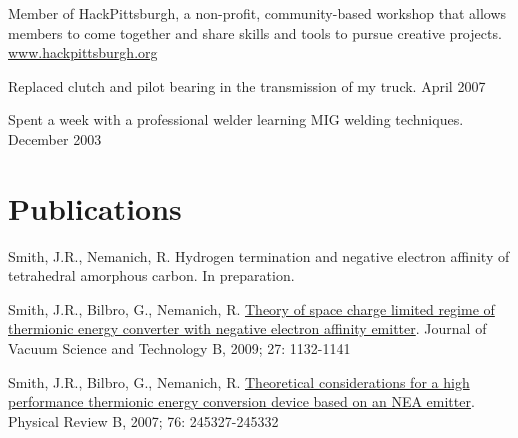 \documentclass[letterpaper,margin,line]{res}
\begin{document}
\begin{resume}
\vspace{-.3cm}
Member of HackPittsburgh, a non-profit, community-based workshop that allows members to come together and share skills and tools to pursue creative projects. \href{http://www.hackpittsburgh.org}{www.hackpittsburgh.org}

\vspace{-.3cm}
Replaced clutch and pilot bearing in the transmission of my truck. April 2007

\vspace{-.3cm}
Spent a week with a professional welder learning MIG welding techniques. December 2003


% 


\section{\sc Publications}
Smith, J.R., Nemanich, R. Hydrogen termination and negative electron affinity of tetrahedral amorphous carbon. In preparation.

Smith, J.R., Bilbro, G., Nemanich, R. \href{http://dx.doi.org/10.1116/1.3125282}{Theory of space charge limited regime of thermionic energy converter with negative electron affinity emitter}. Journal of Vacuum Science and Technology B, 2009; 27: 1132-1141

Smith, J.R., Bilbro, G., Nemanich, R. \href{http://dx.doi.org/10.1103/PhysRevB.76.245327}{Theoretical considerations for a high performance thermionic energy conversion device based on an NEA emitter}. Physical Review B, 2007; 76: 245327-245332


\end{resume}
\end{document}
